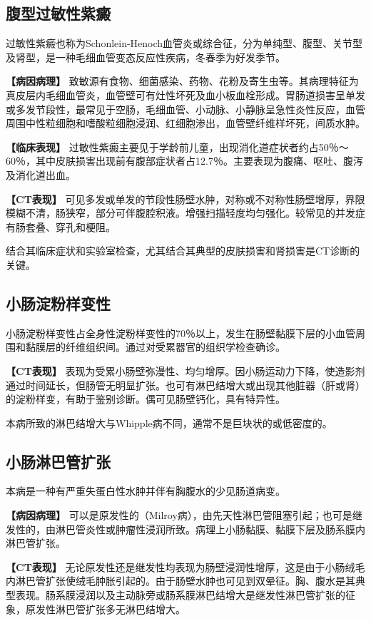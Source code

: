 \subsection{腹型过敏性紫癜}

过敏性紫癜也称为Schonlein-Henoch血管炎或综合征，分为单纯型、腹型、关节型及肾型，是一种毛细血管变态反应性疾病，冬春季为好发季节。

\textbf{【病因病理】}
致敏源有食物、细菌感染、药物、花粉及寄生虫等。其病理特征为真皮层内毛细血管炎，血管壁可有灶性坏死及血小板血栓形成。胃肠道损害呈单发或多发节段性，最常见于空肠，毛细血管、小动脉、小静脉呈急性炎性反应，血管周围中性粒细胞和嗜酸粒细胞浸润、红细胞渗出，血管壁纤维样坏死，间质水肿。

\textbf{【临床表现】}
过敏性紫癜主要见于学龄前儿童，出现消化道症状者约占50％～60％，其中皮肤损害出现前有腹部症状者占12.7％。主要表现为腹痛、呕吐、腹泻及消化道出血。

\textbf{【CT表现】}
可见多发或单发的节段性肠壁水肿，对称或不对称性肠壁增厚，界限模糊不清，肠狭窄，部分可伴腹腔积液。增强扫描轻度均匀强化。较常见的并发症有肠套叠、穿孔和梗阻。

结合其临床症状和实验室检查，尤其结合其典型的皮肤损害和肾损害是CT诊断的关键。

\subsection{小肠淀粉样变性}

小肠淀粉样变性占全身性淀粉样变性的70％以上，发生在肠壁黏膜下层的小血管周围和黏膜层的纤维组织间。通过对受累器官的组织学检查确诊。

\textbf{【CT表现】}
表现为受累小肠壁弥漫性、均匀增厚。因小肠运动力下降，使造影剂通过时间延长，但肠管无明显扩张。也可有淋巴结增大或出现其他脏器（肝或肾）的淀粉样变，有助于鉴别诊断。偶可见肠壁钙化，具有特异性。

本病所致的淋巴结增大与Whipple病不同，通常不是巨块状的或低密度的。

\subsection{小肠淋巴管扩张}

本病是一种有严重失蛋白性水肿并伴有胸腹水的少见肠道病变。

\textbf{【病因病理】}
可以是原发性的（Milroy病），由先天性淋巴管阻塞引起；也可是继发性的，由淋巴管炎性或肿瘤性浸润所致。病理上小肠黏膜、黏膜下层及肠系膜内淋巴管扩张。

\textbf{【CT表现】}
无论原发性还是继发性均表现为肠壁浸润性增厚，这是由于小肠绒毛内淋巴管扩张使绒毛肿胀引起的。由于肠壁水肿也可见到双晕征。胸、腹水是其典型表现。肠系膜浸润以及主动脉旁或肠系膜淋巴结增大是继发性淋巴管扩张的征象，原发性淋巴管扩张多无淋巴结增大。

